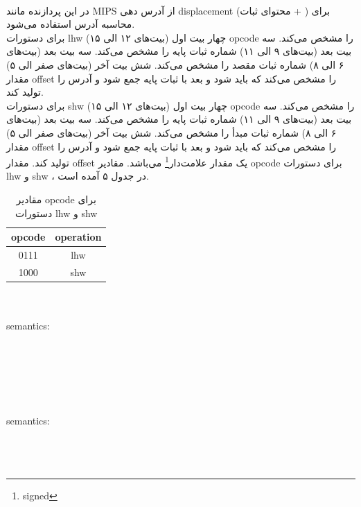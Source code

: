 \\
{در این پردازنده مانند MIPS از آدرس دهی displacement (محتوای ثبات + ) برای محاسبه آدرس استفاده می‌شود.}\\
{برای دستورات lhw چهار بیت اول (بیت‌های ۱۲ الی ۱۵) opcode را مشخص می‌کند. سه بیت بعد (بیت‌های ۹ الی ۱۱) شماره ثبات پایه را مشخص می‌کند. سه بیت بعد (بیت‌های ۶ الی ۸) شماره ثبات مقصد را مشخص می‌کند. شش بیت آخر (بیت‌های صفر الی ۵) مقدار offset را مشخص می‌کند که باید  شود و بعد با ثبات پایه جمع شود و آدرس را تولید کند.}\\
{برای دستورات shw چهار بیت اول (بیت‌های ۱۲ الی ۱۵) opcode را مشخص می‌کند. سه بیت بعد (بیت‌های ۹ الی ۱۱) شماره ثبات پایه را مشخص می‌کند. سه بیت بعد (بیت‌های ۶ الی ۸) شماره ثبات مبدأ را مشخص می‌کند. شش بیت آخر (بیت‌های صفر الی ۵) مقدار offset را مشخص می‌کند که باید  شود و بعد با ثبات پایه جمع شود و آدرس را تولید کند. مقدار offset یک مقدار علامت‌دار\footnote{signed} می‌باشد. مقادیر opcode برای دستورات lhw و shw ، در جدول ۵ آمده است.}\\
\begin{table}[H]
    \centering
    \begin{tabular}{|c|c|}
    \hline
    opcode & operation \\
    \hline
    0111 & lhw \\
    \hline
    1000 & shw \\
    \hline
    \end{tabular}
    \caption{مقادیر opcode برای دستورات lhw و shw}
    \label{lhw-shw-Opcode-Values}
\end{table}
\begin{LTR}
    \\
    \\
    {semantics:}\\
    \\
    \\ 
    \\
\\
    \\
    \\
    {semantics:}\\
    \\
    \\
    \\
\end{LTR}
